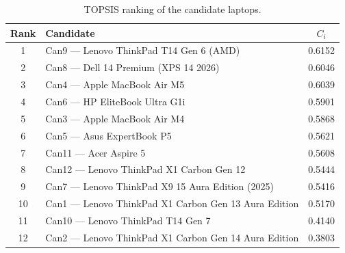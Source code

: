 \begin{table}[htbp]
\centering
\caption{TOPSIS ranking of the candidate laptops.}
\label{tab:topsis-ranking}
\begin{tabular}{clc}
\toprule
Rank & Candidate & $C_i$ \\
\midrule
1 & Can9 --- Lenovo ThinkPad T14 Gen 6 (AMD) & 0.6152 \\
2 & Can8 --- Dell 14 Premium (XPS 14 2026) & 0.6046 \\
3 & Can4 --- Apple MacBook Air M5 & 0.6039 \\
4 & Can6 --- HP EliteBook Ultra G1i & 0.5901 \\
5 & Can3 --- Apple MacBook Air M4 & 0.5868 \\
6 & Can5 --- Asus ExpertBook P5 & 0.5621 \\
7 & Can11 --- Acer Aspire 5 & 0.5608 \\
8 & Can12 --- Lenovo ThinkPad X1 Carbon Gen 12 & 0.5444 \\
9 & Can7 --- Lenovo ThinkPad X9 15 Aura Edition (2025) & 0.5416 \\
10 & Can1 --- Lenovo ThinkPad X1 Carbon Gen 13 Aura Edition & 0.5170 \\
11 & Can10 --- Lenovo ThinkPad T14 Gen 7 & 0.4140 \\
12 & Can2 --- Lenovo ThinkPad X1 Carbon Gen 14 Aura Edition & 0.3803 \\
\bottomrule
\end{tabular}
\end{table}
